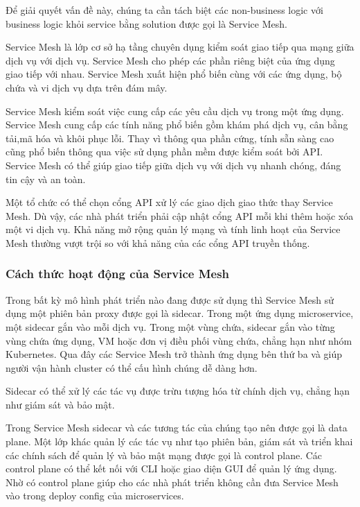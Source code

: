 \documentclass[12pt,a4paper]{report}
\begin{document}
		Để giải quyết vấn đề này, chúng ta cần tách biệt các non-business logic với business logic khỏi service bằng solution được gọi là Service Mesh.
		
		Service Mesh là lớp cơ sở hạ tầng chuyên dụng kiểm soát giao tiếp qua mạng giữa dịch vụ với dịch vụ. Service Mesh cho phép các phần riêng biệt của ứng dụng giao tiếp với nhau. Service Mesh xuất hiện phổ biến cùng với các ứng dụng, bộ chứa và vi dịch vụ dựa trên đám mây.
		
		Service Mesh kiểm soát việc cung cấp các yêu cầu dịch vụ trong một ứng dụng. Service Mesh cung cấp các tính năng phổ biến gồm khám phá dịch vụ, cân bằng tải,mã hóa và khôi phục lỗi. Thay vì thông qua phần cứng, tính sẵn sàng cao cũng phổ biến thông qua việc sử dụng phần mềm được kiểm soát bởi API. Service Mesh có thể giúp giao tiếp giữa dịch vụ với dịch vụ nhanh chóng, đáng tin cậy và an toàn.
		
		Một tổ chức có thể chọn cổng API xử lý các giao dịch giao thức thay Service Mesh. Dù vậy, các nhà phát triển phải cập nhật cổng API mỗi khi thêm hoặc xóa một vi dịch vụ. Khả năng mở rộng quản lý mạng và tính linh hoạt của Service Mesh thường vượt trội so với khả năng của các cổng API truyền thống.
		
		\subsubsection{Cách thức hoạt động của Service Mesh}
		\hspace{0.6cm}Trong bất kỳ mô hình phát triển nào đang được sử dụng thì Service Mesh sử dụng một phiên bản proxy được gọi là sidecar. Trong một ứng dụng microservice, một sidecar gắn vào mỗi dịch vụ. Trong một vùng chứa, sidecar gắn vào từng vùng chứa ứng dụng, VM hoặc đơn vị điều phối vùng chứa, chẳng hạn như nhóm Kubernetes. Qua đây các Service Mesh trở thành ứng dụng bên thứ ba và giúp người vận hành cluster có thể cấu hình chúng dễ dàng hơn.
		
		Sidecar có thể xử lý các tác vụ được trừu tượng hóa từ chính dịch vụ, chẳng hạn như giám sát và bảo mật.
		
		Trong Service Mesh sidecar và các tương tác của chúng tạo nên được gọi là data plane. Một lớp khác quản lý các tác vụ như tạo phiên bản, giám sát và triển khai các chính sách để quản lý và bảo mật mạng được gọi là control plane. Các control plane có thể kết nối với CLI hoặc giao diện GUI để quản lý ứng dụng. Nhờ có control plane giúp cho các nhà phát triển không cần đưa Service Mesh vào trong deploy config của microservices.
		
\end{document}
